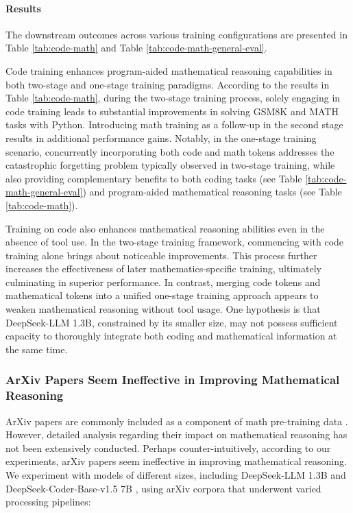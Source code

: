 \begin{itemize}[topsep=0pt]
\begin{itemize}[topsep=0pt]
\paragraph{Results}
The downstream outcomes across various training configurations are presented in Table \ref{tab:code-math} and Table \ref{tab:code-math-general-eval}.

Code training enhances program-aided mathematical reasoning capabilities in both two-stage and one-stage training paradigms. According to the results in Table \ref{tab:code-math}, during the two-stage training process, solely engaging in code training leads to substantial improvements in solving GSM8K and MATH tasks with Python. Introducing math training as a follow-up in the second stage results in additional performance gains. Notably, in the one-stage training scenario, concurrently incorporating both code and math tokens addresses the catastrophic forgetting problem typically observed in two-stage training, while also providing complementary benefits to both coding tasks (see Table \ref{tab:code-math-general-eval}) and program-aided mathematical reasoning tasks (see Table \ref{tab:code-math}).

Training on code also enhances mathematical reasoning abilities even in the absence of tool use. In the two-stage training framework, commencing with code training alone brings about noticeable improvements. This process further increases the effectiveness of later mathematics-specific training, ultimately culminating in superior performance. In contrast, merging code tokens and mathematical tokens into a unified one-stage training approach appears to weaken mathematical reasoning without tool usage. One hypothesis is that DeepSeek-LLM 1.3B, constrained by its smaller size, may not possess sufficient capacity to thoroughly integrate both coding and mathematical information at the same time.

\subsubsection{ArXiv Papers Seem Ineffective in Improving Mathematical Reasoning}

ArXiv papers are commonly included as a component of math pre-training data \citep{minerva,gpt-f,llemma,mathpile}. However, detailed analysis regarding their impact on mathematical reasoning has not been extensively conducted. Perhaps counter-intuitively, according to our experiments, arXiv papers seem ineffective in improving mathematical reasoning. We experiment with models of different sizes, including DeepSeek-LLM 1.3B and DeepSeek-Coder-Base-v1.5 7B \citep{deepseek-coder}, using arXiv corpora that underwent varied processing pipelines:


\end{itemize}
\end{itemize}
